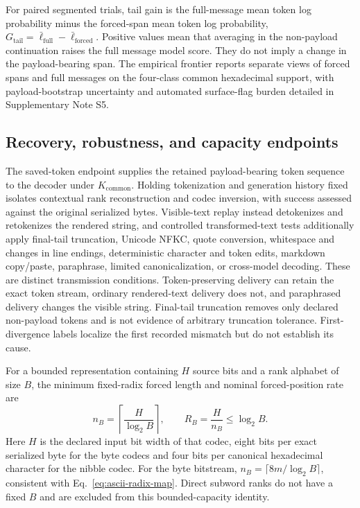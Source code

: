 \documentclass[fleqn,10pt]{wlscirep}
\begin{document}
For paired segmented trials, tail gain is the full-message mean token log probability minus the forced-span mean token log probability, \(G_{\mathrm{tail}}=\bar\ell_{\mathrm{full}}-\bar\ell_{\mathrm{forced}}\). Positive values mean that averaging in the non-payload continuation raises the full message model score. They do not imply a change in the payload-bearing span. The empirical frontier reports separate views of forced spans and full messages on the four-class common hexadecimal support, with payload-bootstrap uncertainty and automated surface-flag burden detailed in Supplementary Note S5.

\subsection*{Recovery, robustness, and capacity endpoints}\label{sec:replay-method}\label{sec:capacity-method}\label{sec:endpoint-method}

The saved-token endpoint supplies the retained payload-bearing token sequence to the decoder under \(K_{\mathrm{common}}\). Holding tokenization and generation history fixed isolates contextual rank reconstruction and codec inversion, with success assessed against the original serialized bytes. Visible-text replay instead detokenizes and retokenizes the rendered string, and controlled transformed-text tests additionally apply final-tail truncation, Unicode NFKC, quote conversion, whitespace and changes in line endings, deterministic character and token edits, markdown copy/paste, paraphrase, limited canonicalization, or cross-model decoding\cite{YanMurawaki2025TokenizationInconsistency}. These are distinct transmission conditions. Token-preserving delivery can retain the exact token stream, ordinary rendered-text delivery does not, and paraphrased delivery changes the visible string. Final-tail truncation removes only declared non-payload tokens and is not evidence of arbitrary truncation tolerance. First-divergence labels localize the first recorded mismatch but do not establish its cause.


For a bounded representation containing \(H\) source bits and a rank alphabet of size \(B\), the minimum fixed-radix forced length and nominal forced-position rate are
\begin{equation}
n_B=\left\lceil\frac{H}{\log_2B}\right\rceil,
\qquad
R_B=\frac{H}{n_B}\le\log_2B.
\label{eq:capacity}
\end{equation}
Here \(H\) is the declared input bit width of that codec, eight bits per exact serialized byte for the byte codecs and four bits per canonical hexadecimal character for the nibble codec. For the byte bitstream, \(n_B=\lceil8m/\log_2B\rceil\), consistent with Eq.~\eqref{eq:ascii-radix-map}. Direct subword ranks do not have a fixed \(B\) and are excluded from this bounded-capacity identity.
\end{document}
